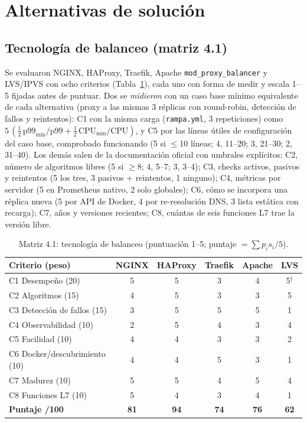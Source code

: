 \documentclass[conference]{IEEEtran}
\begin{document}
\section{Alternativas de solución}
\subsection{Tecnología de balanceo (matriz 4.1)}
Se evaluaron NGINX, HAProxy, Traefik, Apache \texttt{mod\_proxy\_balancer} y LVS/IPVS con ocho criterios (Tabla~\ref{tab:m41}), cada uno con forma de medir y escala 1--5 fijadas antes de puntuar. Dos se \emph{midieron} con un caso base mínimo equivalente de cada alternativa (proxy a las mismas 3 réplicas con round-robin, detección de fallos y reintentos): C1 con la misma carga (\texttt{rampa.yml}, 3 repeticiones) como $5\,(\tfrac12\,\mathrm{p99}_{\min}/\mathrm{p99}+\tfrac12\,\mathrm{CPU}_{\min}/\mathrm{CPU})$, y C5 por las líneas útiles de configuración del caso base, comprobado funcionando (5 si $\le$10 líneas; 4, 11--20; 3, 21--30; 2, 31--40). Los demás salen de la documentación oficial con umbrales explícitos: C2, número de algoritmos libres (5 si $\ge$8; 4, 5--7; 3, 3--4); C3, checks activos, pasivos y reintentos (5 los tres, 3 pasivos + reintentos, 1 ninguno); C4, métricas por servidor (5 en Prometheus nativo, 2 solo globales); C6, cómo se incorpora una réplica nueva (5 por API de Docker, 4 por re-resolución DNS, 3 lista estática con recarga); C7, años y versiones recientes; C8, cuántas de seis funciones L7 trae la versión libre.

\begin{table}[t]
\caption{Matriz 4.1: tecnología de balanceo (puntuación 1--5; puntaje $=\sum p_i s_i/5$).}
\label{tab:m41}
\centering\scriptsize\setlength{\tabcolsep}{3.5pt}
\begin{tabular}{lccccc}
\toprule
Criterio (peso) & NGINX & HAProxy & Traefik & Apache & LVS\\
\midrule
C1 Desempeño (20) & 5 & 5 & 3 & 4 & 5$^\dagger$\\
C2 Algoritmos (15) & 4 & 5 & 3 & 3 & 5\\
C3 Detección de fallos (15) & 3 & 5 & 5 & 5 & 1\\
C4 Observabilidad (10) & 2 & 5 & 4 & 3 & 4\\
C5 Facilidad (10) & 4 & 4 & 3 & 3 & 2\\
C6 Docker/descubrimiento (10) & 4 & 4 & 5 & 3 & 1\\
C7 Madurez (10) & 5 & 5 & 4 & 5 & 4\\
C8 Funciones L7 (10) & 5 & 4 & 3 & 4 & 1\\
\midrule
\textbf{Puntaje /100} & \textbf{81} & \textbf{94} & \textbf{74} & \textbf{76} & \textbf{62}\\
\bottomrule
\end{tabular}
\end{table}
\end{document}

